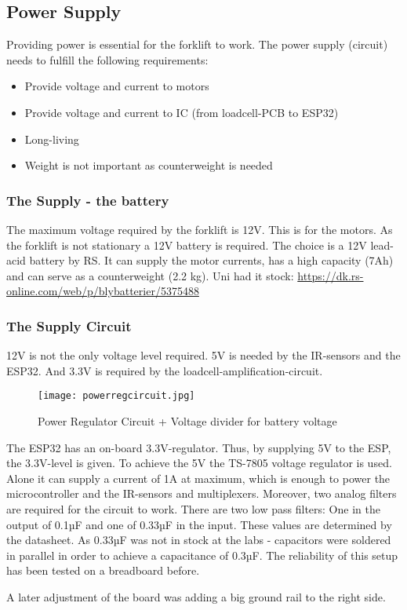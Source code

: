 \documentclass[../report.tex]{subfiles}
\begin{document}
\subsection{Power Supply}
Providing power is essential for the forklift to work. The power supply (circuit)
needs to fulfill the following requirements:
\begin{itemize}
    \item Provide voltage and current to motors
    \item Provide voltage and current to IC (from loadcell-PCB to ESP32)
    \item Long-living
    \item Weight is not important as counterweight is needed
\end{itemize} 
\subsubsection{The Supply - the battery}
The maximum voltage required by the forklift is 12V. This is for the motors. As the forklift
is not stationary a 12V battery is required. The choice is a 12V lead-acid 
battery by RS. It can supply the motor currents, has a high capacity (7Ah) and can serve as a counterweight (2.2 kg).
Uni had it stock: \url{https://dk.rs-online.com/web/p/blybatterier/5375488}
\subsubsection{The Supply Circuit}
12V is not the only voltage level required. 5V is needed by the IR-sensors and the ESP32. And 3.3V is required
by the loadcell-amplification-circuit. 
\begin{figure}[h!]
    \centering
    \texttt{[image: powerregcircuit.jpg]}
    \caption{Power Regulator Circuit + Voltage divider for battery voltage}
 \end{figure}
The ESP32 has an on-board 3.3V-regulator. Thus, by supplying 5V to the ESP, the 3.3V-level is given.
To achieve the 5V the TS-7805 voltage regulator is used. Alone it can supply a current of 1A at maximum, which
is enough to power the microcontroller and the IR-sensors and multiplexers. Moreover, two analog filters are required
for the circuit to work. There are two low pass filters: One in the output of 0.1µF and one of 0.33µF in the input.
These values are determined by the datasheet. As 0.33µF was not in stock at the labs - capacitors were 
soldered in parallel in order to achieve a capacitance of 0.3µF. The reliability of this setup
has been tested on a breadboard before.

A later adjustment of the board was adding a big ground rail to the right side.
\end{document}
